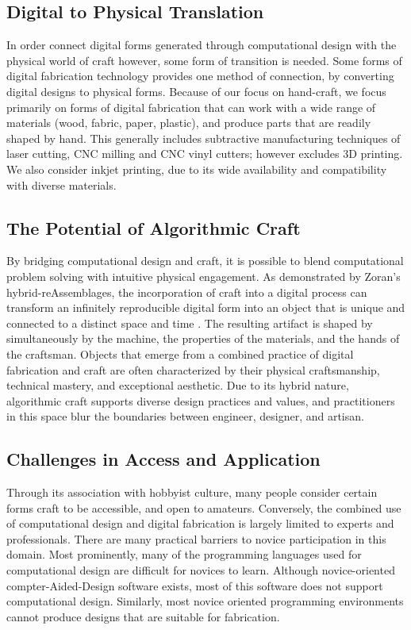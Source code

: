 \documentclass{sigchi}
\begin{document}
\subsection{Digital to Physical Translation}
In order connect digital forms generated through computational design with the physical world of craft however, some form of transition is needed. Some forms of digital fabrication technology provides one method of connection, by converting digital designs to physical forms. Because of our focus on hand-craft, we focus primarily on forms of digital fabrication that can work with a wide range of materials (wood, fabric, paper, plastic), and produce parts that are readily shaped by hand. This generally includes subtractive manufacturing techniques of laser cutting, CNC milling and CNC vinyl cutters\cite{dunn}; however excludes 3D printing. We also consider inkjet printing, due to its wide availability and compatibility with diverse materials.

\subsection{The Potential of Algorithmic Craft}
By bridging computational design and craft, it is possible to blend computational problem solving with intuitive physical engagement. As demonstrated by Zoran's hybrid-reAssemblages, the incorporation of craft into a digital process can transform an infinitely reproducible digital form into an object that is unique and connected to a distinct space and time \cite{zoran}. The resulting artifact is shaped by simultaneously by the machine, the properties of the materials, and the hands of the craftsman. Objects that emerge from a combined practice of digital fabrication and craft are often characterized by their physical craftsmanship, technical mastery, and exceptional aesthetic. Due to its hybrid nature, algorithmic craft supports diverse design practices and values, and practitioners in this space blur the boundaries between engineer, designer, and artisan.

\subsection{Challenges in Access and Application}
Through its association with hobbyist culture, many people consider certain forms craft to be accessible, and open to amateurs. Conversely, the combined use of computational design and digital fabrication is largely limited to experts and professionals. There are many practical barriers to novice participation in this domain. Most prominently, many of the programming languages used for computational design are difficult for novices to learn. Although novice-oriented compter-Aided-Design software exists, most of this software does not support computational design. Similarly, most novice oriented programming environments cannot produce designs that are suitable for fabrication. 
\end{document}
